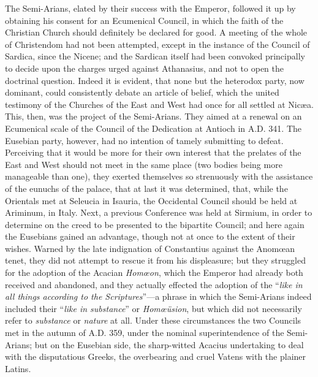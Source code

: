 The Semi-Arians, elated by their success with the Emperor, followed
it up by obtaining his consent for an Ecumenical Council, in which the
faith of the Christian Church should definitely be declared for good.
A meeting of the whole of Christendom had not been attempted, except
in the instance of the Council of Sardica, since the Nicene; and the
Sardican itself had been convoked principally to decide upon the
charges urged against Athanasius, and not to open the doctrinal
question. Indeed it is evident, that none but the heterodox party, now
dominant, could consistently debate an article of belief, which the
united testimony of the Churches of the East and West had once for all
settled at Nicæa. This, then, was the project of the Semi-Arians.
They aimed at a renewal on an Ecumenical scale of the Council of the
Dedication at Antioch in A.D. 341. The Eusebian
party, however, had no intention of tamely submitting to defeat.
Perceiving that it would be more for their own interest that the
prelates of the East and West should not meet in the same place (two
bodies being more manageable than one), they exerted themselves
so strenuously with the assistance of the eunuchs of the palace, that
at last it was determined, that, while the Orientals met at Seleucia
in Isauria, the Occidental Council should be held at Ariminum, in
Italy. Next, a previous Conference was held at Sirmium, in order to
determine on the creed to be presented to the bipartite Council; and
here again the Eusebians gained an advantage, though not at once to
the extent of their wishes. Warned by the late indignation of
Constantius against the Anomœan tenet, they did not attempt to rescue
it from his displeasure; but they struggled for the adoption of the
Acacian \emph{Homœon}, which the Emperor had already both received
and abandoned, and they actually effected the adoption of the ``\emph{like
in all things according to the Scriptures}''—a phrase in
which the Semi-Arians indeed included their ``\emph{like in substance}''
or \emph{Homœüsion}, but which did not necessarily refer to \emph{substance}
or \emph{nature} at all. Under these circumstances the two Councils
met in the autumn of A.D. 359, under the nominal
superintendence of the Semi-Arians; but on the Eusebian side, the
sharp-witted Acacius undertaking to deal with the disputatious Greeks,
the overbearing and cruel Vatens with the plainer Latins.

